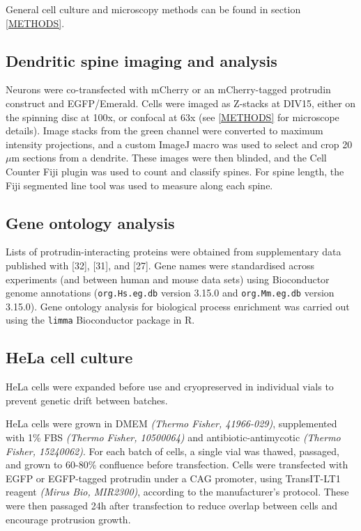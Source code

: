 \documentclass[
  12pt,
  a4paper,
]{book}
\begin{document}
General cell culture and microscopy methods can be found in section \ref{METHODS}.

\hypertarget{dendritic-spine-imaging-and-analysis}{%
\subsection{Dendritic spine imaging and analysis}\label{dendritic-spine-imaging-and-analysis}}

Neurons were co-transfected with mCherry or an mCherry-tagged protrudin construct and EGFP/Emerald. Cells were imaged as Z-stacks at DIV15, either on the spinning disc at 100x, or confocal at 63x (see \ref{METHODS} for microscope details). Image stacks from the green channel were converted to maximum intensity projections, and a custom ImageJ macro was used to select and crop 20\(\mu\)m sections from a dendrite. These images were then blinded, and the Cell Counter Fiji plugin was used to count and classify spines. For spine length, the Fiji segmented line tool was used to measure along each spine.

\hypertarget{gene-ontology-analysis}{%
\subsection{Gene ontology analysis}\label{gene-ontology-analysis}}

Lists of protrudin-interacting proteins were obtained from supplementary data published with {[}32{]}, {[}31{]}, and {[}27{]}. Gene names were standardised across experiments (and between human and mouse data sets) using Bioconductor genome annotations (\texttt{org.Hs.eg.db} version 3.15.0 and \texttt{org.Mm.eg.db} version 3.15.0). Gene ontology analysis for biological process enrichment was carried out using the \texttt{limma} Bioconductor package in R.

\hypertarget{hela-cell-culture}{%
\subsection{HeLa cell culture}\label{hela-cell-culture}}

HeLa cells were expanded before use and cryopreserved in individual vials to prevent genetic drift between batches.

HeLa cells were grown in DMEM \emph{(Thermo Fisher, 41966-029)}, supplemented with 1\% FBS \emph{(Thermo Fisher, 10500064)} and antibiotic-antimycotic \emph{(Thermo Fisher, 15240062)}. For each batch of cells, a single vial was thawed, passaged, and grown to 60-80\% confluence before transfection. Cells were transfected with EGFP or EGFP-tagged protrudin under a CAG promoter, using TransIT-LT1 reagent \emph{(Mirus Bio, MIR2300)}, according to the manufacturer's protocol. These were then passaged 24h after transfection to reduce overlap between cells and encourage protrusion growth.
\end{document}
